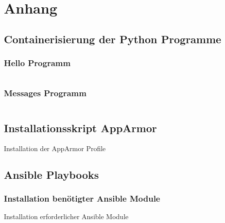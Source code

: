 \section{Anhang}

\subsection{Containerisierung der Python Programme}

\subsubsection{Hello Programm}

\inputminted[fontfamily=tt,
linenos=true,
numberblanklines=true,
numbersep=5pt,
gobble=0,
frame=leftline,
framerule=0.4pt,
framesep=2mm,
funcnamehighlighting=true,
tabsize=4,
obeytabs=false,
mathescape=false
samepage=false, %
showspaces=false,
showtabs =false,
texcl=false,
breaklines=true]{docker}{code/docker/hello/Dockerfile}

\subsubsection{Messages Programm}
\inputminted[fontfamily=tt,
linenos=true,
numberblanklines=true,
numbersep=5pt,
gobble=0,
frame=leftline,
framerule=0.4pt,
framesep=2mm,
funcnamehighlighting=true,
tabsize=4,
obeytabs=false,
mathescape=false
samepage=false, %
showspaces=false,
showtabs =false,
texcl=false,
breaklines=true]{docker}{code/docker/messages/Dockerfile}

\subsection{Installationsskript AppArmor}

\begin{listing}[ht]{}
    \caption{Installation der AppArmor Profile}
    \label{listing:installation_apparmor}
\end{listing}

\newpage
\subsection{Ansible Playbooks}

\subsubsection{Installation benötigter Ansible Module}
\begin{listing}
    \caption{Installation erforderlicher Ansible Module}
    \label{listing:ansible_module_installation}
\end{listing}


